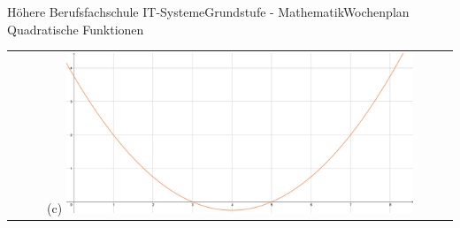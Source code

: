 \documentclass[oneside,openany,headings=optiontotoc,11pt,numbers=noenddot]{scrreprt}
\begin{document}
\begin{worksheet}{Höhere Berufsfachschule IT-Systeme}{Grundstufe - Mathematik}{Wochenplan Quadratische Funktionen}
\begin{framed}
\begin{tabularx}{\textwidth}{XX}
				\multicolumn{2}{c}{(c) \includegraphics[width=0.8\textwidth, align=t]{../99_Bilder/WP5DiCL.jpg}}
			\end{tabularx}
		\end{framed}
	\end{worksheet}
\end{document}
